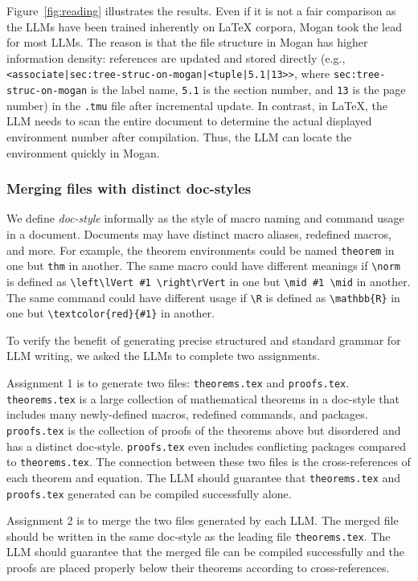 Figure~\ref{fig:reading} illustrates the results. Even if it is not a fair comparison as the LLMs have been trained inherently on \LaTeX{} corpora, Mogan took the lead for most LLMs. The reason is that the file structure in Mogan has higher information density: references are updated and stored directly (e.g., \verb!<associate|sec:tree-struc-on-mogan|<tuple|5.1|13>>!, where \verb!sec:tree-struc-on-mogan! is the label name, \verb!5.1! is the section number, and \verb!13! is the page number) in the \texttt{.tmu} file after incremental update. In contrast, in \LaTeX{}, the LLM needs to scan the entire document to determine the actual displayed environment number after compilation. Thus, the LLM can locate the environment quickly in Mogan.

\subsubsection{Merging files with distinct doc-styles}
\label{sec:doc-style}

We define \emph{doc-style} informally as the style of macro naming and command usage in a document. Documents may have distinct macro aliases, redefined macros, and more. For example, the theorem environments could be named \verb|theorem| in one but \verb|thm| in another. The same macro could have different meanings if \verb|\norm| is defined as \verb|\left\lVert #1 \right\rVert| in one but \verb|\mid #1 \mid| in another. The same command could have different usage if \verb|\R| is defined as \verb|\mathbb{R}| in one but \verb|\textcolor{red}{#1}| in another.

To verify the benefit of generating precise structured and standard grammar for LLM writing, we asked the LLMs to complete two assignments.

Assignment 1 is to generate two files: \texttt{theorems.tex} and \texttt{proofs.tex}. \texttt{theorems.tex} is a large collection of mathematical theorems in a doc-style that includes many newly-defined macros, redefined commands, and packages. \texttt{proofs.tex} is the collection of proofs of the theorems above but disordered and has a distinct doc-style. \texttt{proofs.tex} even includes conflicting packages compared to \texttt{theorems.tex}. The connection between these two files is the cross-references of each theorem and equation. The LLM should guarantee that \texttt{theorems.tex} and \texttt{proofs.tex} generated can be compiled successfully alone.

Assignment 2 is to merge the two files generated by each LLM. The merged file should be written in the same doc-style as the leading file \texttt{theorems.tex}. The LLM should guarantee that the merged file can be compiled successfully and the proofs are placed properly below their theorems according to cross-references.

